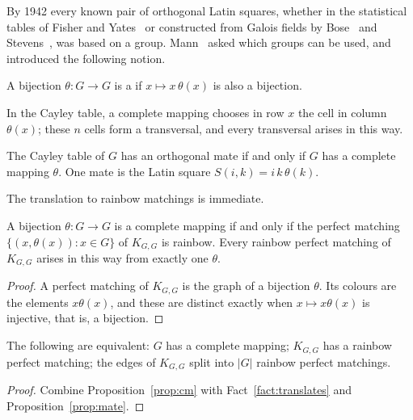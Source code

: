 
By 1942 every known pair of orthogonal Latin squares, whether in the statistical tables of Fisher and Yates~\cite{fy} or constructed from Galois fields by Bose~\cite{bose38} and Stevens~\cite{ste39}, was based on a group. Mann~\cite{man42} asked which groups can be used, and introduced the following notion.

\begin{definition}\label{def:complete-mapping}
A bijection $\theta\colon G\to G$ is a  if $x\mapsto x\,\theta(x)$ is also a bijection.
\end{definition}

In the Cayley table, a complete mapping chooses in row $x$ the cell in column $\theta(x)$; these $n$ cells form a transversal, and every transversal arises in this way.

\begin{theorem}\label{thm:mann}
The Cayley table of $G$ has an orthogonal mate if and only if $G$ has a complete mapping $\theta$. One mate is the Latin square $S(i,k)=i\,k\,\theta(k)$.
\end{theorem}

The translation to rainbow matchings is immediate.

\begin{proposition}\label{prop:cm}
A bijection $\theta\colon G\to G$ is a complete mapping if and only if the perfect matching $\{(x,\theta(x)):x\in G\}$ of $K_{G,G}$ is rainbow. Every rainbow perfect matching of $K_{G,G}$ arises in this way from exactly one $\theta$.
\end{proposition}

\begin{proof}
A perfect matching of $K_{G,G}$ is the graph of a bijection $\theta$. Its colours are the elements $x\theta(x)$, and these are distinct exactly when $x\mapsto x\theta(x)$ is injective, that is, a bijection.
\end{proof}

\begin{corollary}\label{cor:cm}
The following are equivalent: $G$ has a complete mapping; $K_{G,G}$ has a rainbow perfect matching; the edges of $K_{G,G}$ split into $|G|$ rainbow perfect matchings.
\end{corollary}

\begin{proof}
Combine Proposition~\ref{prop:cm} with Fact~\ref{fact:translates} and Proposition~\ref{prop:mate}.
\end{proof}

